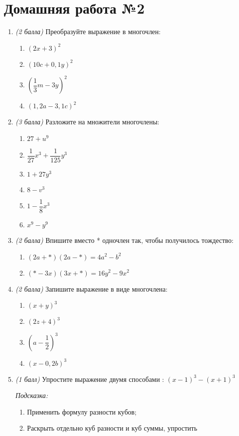 \documentclass[12pt, a4paper]{article}
\begin{document}
	
	\section*{Домашняя работа №2}
	\begin{enumerate}
		\item \textit{(2 балла)} Преобразуйте выражение в многочлен:
		\begin{multicols}{2}
			\begin{enumerate}[label=\asbuk*)]
			\item $(2x+3)^2$
			\item $(10c+0,1y)^2$
			\item $(\dfrac{1}{3}m-3y)^2$
			\item $(1,2a-3,1c)^2$
		\end{enumerate}
	\end{multicols}
		\item \textit{(3 балла)} Разложите на множители многочлены:
		\begin{multicols}{2}
		\begin{enumerate}[label=\asbuk*)]
			\item $27+u^9$
			\item $\dfrac{1}{27}x^3+\dfrac{1}{125}y^3$
			\item $1+27y^3$
			\item $8-v^3$
			\item $1-\dfrac{1}{8}x^3$
			\item $x^9-y^9$
		\end{enumerate}
	\end{multicols}
	\item \textit{(2 балла)} Впишите вместо * одночлен так, чтобы получилось тождество:
			\begin{enumerate}[label=\asbuk*)]
			\item $(2a+*)(2a-*)=4a^2-b^2$
			\item $(*-3x)(3x+*)=16y^2-9x^2$
			\end{enumerate}
		\item \textit{(2 балла)} Запишите выражение в виде многочлена:
		\begin{multicols}{2}
			\begin{enumerate}[label=\asbuk*)]
				\item $(x+y)^3$
				\item $(2z+4)^3$
				\item $(a-\dfrac{1}{2})^3$
				\item $(x-0,2b)^3$
			\end{enumerate}
		\end{multicols}
	\item \textit{(1 балл)} Упростите выражение двумя способами :
	$(x-1)^3-(x+1)^3$
	
	\textit{Подсказка:} \begin{enumerate}[label=\asbuk*)]
	 \item  Применить формулу разности кубов;
	\item Раскрыть отдельно куб разности и куб суммы, упростить
\end{enumerate}
	\end{enumerate}
\end{document}
